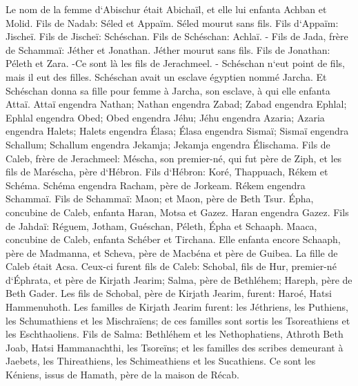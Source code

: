 \verse Le nom de la femme d`Abischur était Abichaïl, et elle lui enfanta Achban et Molid. 
\verse Fils de Nadab: Séled et Appaïm. Séled mourut sans fils. 
\verse Fils d`Appaïm: Jischeï. Fils de Jischeï: Schéschan. Fils de Schéschan: Achlaï. - 
\verse Fils de Jada, frère de Schammaï: Jéther et Jonathan. Jéther mourut sans fils. 
\verse Fils de Jonathan: Péleth et Zara. -Ce sont là les fils de Jerachmeel. - 
\verse Schéschan n`eut point de fils, mais il eut des filles. Schéschan avait un esclave égyptien nommé Jarcha. 
\verse Et Schéschan donna sa fille pour femme à Jarcha, son esclave, à qui elle enfanta Attaï. 
\verse Attaï engendra Nathan; Nathan engendra Zabad; 
\verse Zabad engendra Ephlal; Ephlal engendra Obed; 
\verse Obed engendra Jéhu; Jéhu engendra Azaria; 
\verse Azaria engendra Halets; Halets engendra Élasa; 
\verse Élasa engendra Sismaï; Sismaï engendra Schallum; 
\verse Schallum engendra Jekamja; Jekamja engendra Élischama. 
\verse Fils de Caleb, frère de Jerachmeel: Méscha, son premier-né, qui fut père de Ziph, et les fils de Maréscha, père d`Hébron. 
\verse Fils d`Hébron: Koré, Thappuach, Rékem et Schéma. 
\verse Schéma engendra Racham, père de Jorkeam. Rékem engendra Schammaï. 
\verse Fils de Schammaï: Maon; et Maon, père de Beth Tsur. 
\verse Épha, concubine de Caleb, enfanta Haran, Motsa et Gazez. Haran engendra Gazez. 
\verse Fils de Jahdaï: Réguem, Jotham, Guéschan, Péleth, Épha et Schaaph. 
\verse Maaca, concubine de Caleb, enfanta Schéber et Tirchana. 
\verse Elle enfanta encore Schaaph, père de Madmanna, et Scheva, père de Macbéna et père de Guibea. La fille de Caleb était Acsa. 
\verse Ceux-ci furent fils de Caleb: Schobal, fils de Hur, premier-né d`Éphrata, et père de Kirjath Jearim; 
\verse Salma, père de Bethléhem; Hareph, père de Beth Gader. 
\verse Les fils de Schobal, père de Kirjath Jearim, furent: Haroé, Hatsi Hammenuhoth. 
\verse Les familles de Kirjath Jearim furent: les Jéthriens, les Puthiens, les Schumathiens et les Mischraïens; de ces familles sont sortis les Tsoreathiens et les Eschthaoliens. 
\verse Fils de Salma: Bethléhem et les Nethophatiens, Athroth Beth Joab, Hatsi Hammanachthi, les Tsoreïns; 
\verse et les familles des scribes demeurant à Jaebets, les Thireathiens, les Schimeathiens et les Sucathiens. Ce sont les Kéniens, issus de Hamath, père de la maison de Récab. 

